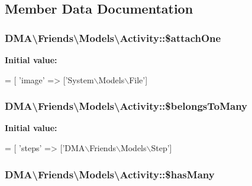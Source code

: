 \subsection{Member Data Documentation}
\hypertarget{classDMA_1_1Friends_1_1Models_1_1Activity_a9911cb733cbc863cc1bdccde254404b5}{
\subsubsection[{\$attach\+One}]{\setlength{\rightskip}{0pt plus 5cm}D\+M\+A\textbackslash{}\+Friends\textbackslash{}\+Models\textbackslash{}\+Activity\+::\$attach\+One}}\label{classDMA_1_1Friends_1_1Models_1_1Activity_a9911cb733cbc863cc1bdccde254404b5}
{\bfseries Initial value\+:}
\begin{DoxyCode}
= [
        \textcolor{stringliteral}{'image'} => [\textcolor{stringliteral}{'System\(\backslash\)Models\(\backslash\)File'}]
\end{DoxyCode}
\hypertarget{classDMA_1_1Friends_1_1Models_1_1Activity_ae5245e6eb74228cd54d8ae77e5a9bb38}{
\subsubsection[{\$belongs\+To\+Many}]{\setlength{\rightskip}{0pt plus 5cm}D\+M\+A\textbackslash{}\+Friends\textbackslash{}\+Models\textbackslash{}\+Activity\+::\$belongs\+To\+Many}}\label{classDMA_1_1Friends_1_1Models_1_1Activity_ae5245e6eb74228cd54d8ae77e5a9bb38}
{\bfseries Initial value\+:}
\begin{DoxyCode}
= [
        \textcolor{stringliteral}{'steps'} => [\textcolor{stringliteral}{'DMA\(\backslash\)Friends\(\backslash\)Models\(\backslash\)Step'}]
\end{DoxyCode}
\hypertarget{classDMA_1_1Friends_1_1Models_1_1Activity_a8b255e9889df95f8c702b72ed49ace25}{
\subsubsection[{\$has\+Many}]{\setlength{\rightskip}{0pt plus 5cm}D\+M\+A\textbackslash{}\+Friends\textbackslash{}\+Models\textbackslash{}\+Activity\+::\$has\+Many}}\label{classDMA_1_1Friends_1_1Models_1_1Activity_a8b255e9889df95f8c702b72ed49ace25}
